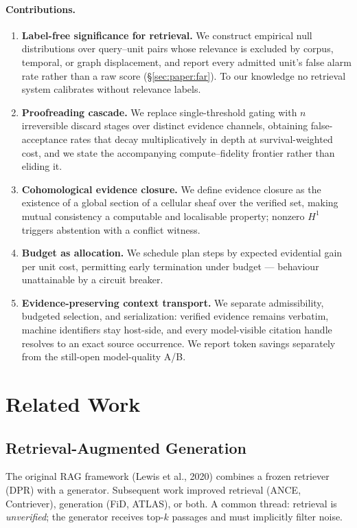 \paragraph{Contributions.}
\begin{enumerate}
  \item \textbf{Label-free significance for retrieval.} We construct empirical null distributions over query--unit pairs whose relevance is excluded by corpus, temporal, or graph displacement, and report every admitted unit's false alarm rate rather than a raw score (\S\ref{sec:paper:far}). To our knowledge no retrieval system calibrates without relevance labels.
  \item \textbf{Proofreading cascade.} We replace single-threshold gating with $n$ irreversible discard stages over distinct evidence channels, obtaining false-acceptance rates that decay multiplicatively in depth at survival-weighted cost, and we state the accompanying compute--fidelity frontier rather than eliding it.
  \item \textbf{Cohomological evidence closure.} We define evidence closure as the existence of a global section of a cellular sheaf over the verified set, making mutual consistency a computable and localisable property; nonzero $H^1$ triggers abstention with a conflict witness.
  \item \textbf{Budget as allocation.} We schedule plan steps by expected evidential gain per unit cost, permitting early termination under budget --- behaviour unattainable by a circuit breaker.
  \item \textbf{Evidence-preserving context transport.} We separate admissibility, budgeted selection, and serialization: verified evidence remains verbatim, machine identifiers stay host-side, and every model-visible citation handle resolves to an exact source occurrence. We report token savings separately from the still-open model-quality A/B.
\end{enumerate}

\section{Related Work}
\label{sec:paper:related}

\subsection{Retrieval-Augmented Generation}
The original RAG framework (Lewis et al., 2020) combines a frozen retriever (DPR) with a generator. Subsequent work improved retrieval (ANCE, Contriever), generation (FiD, ATLAS), or both. A common thread: retrieval is \emph{unverified}; the generator receives top-$k$ passages and must implicitly filter noise.

